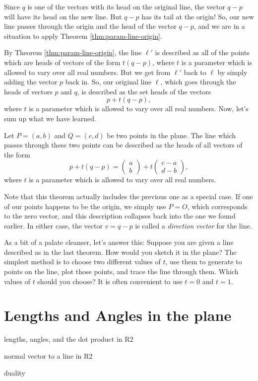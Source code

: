 \documentclass[00-livre-main.tex]{subfiles}
\begin{document}
Since $q$ is one of the vectors with its head on the original line, the vector $q-p$ will have its head on the new line.
But $q-p$ has its tail at the origin!
So, our new line passes through the origin and the head of the vector $q-p$, and we are in a situation to apply Theorem \ref{thm:param-line-origin}.


By Theorem \ref{thm:param-line-origin}, the line $\ell'$ is described as all of the points which are heads of vectors of the form
$t (q-p)$, where $t$ is a parameter which is allowed to vary over all real numbers.
But we get from $\ell'$ back to $\ell$ by simply adding the vector $p$ back in.
So, our original line $\ell$, which goes through the heads of vectors $p$ and $q$, is described as the set heads of the vectors
\[
p + t (q-p),
\]
where $t$ is a parameter which is allowed to vary over all real numbers.
Now, let's sum up what we have learned.

\begin{theorem}\label{thm:param-line}
Let $P = (a,b)$ and $Q = (c,d)$ be two points in the plane. The line which passes through these two points can be described as the heads of all vectors of the form
\[
p+t(q-p) = \begin{pmatrix} a \\ b \end{pmatrix} + t \begin{pmatrix} c-a \\ d-b\end{pmatrix},
\]
where $t$ is a parameter which is allowed to vary over all real numbers.
\end{theorem}

Note that this theorem actually includes the previous one as a special case.
If one of our points happens to be the origin, we simply use $P=O$, which corresponds to the zero vector, and this description collapses back into the one we found earlier.
In either case, the vector $v= q-p$ is called a \emph{direction vector} for the line.


As a bit of a palate cleanser, let's answer this: Suppose you are given a line described as in the last theorem. How would you sketch it in the plane? The simplest method is to choose two different values of $t$, use them to generate to points on the line, plot those points, and trace the line through them. Which values of $t$ should you choose? It is often convenient to use $t=0$ and $t=1$.



\section*{Lengths and Angles in the plane}
\begin{compactitem}
\item lengths, angles, and the dot product in R2
\item normal vector to a line in R2
\item duality
\end{compactitem}
\end{document}
